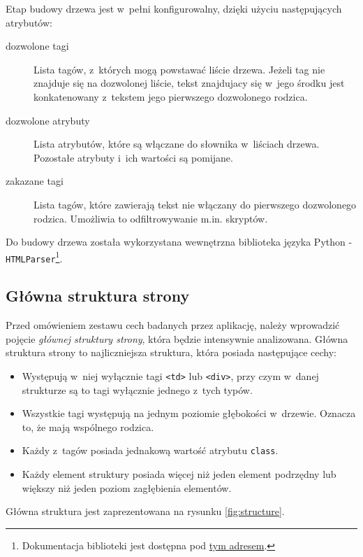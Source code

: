 \documentclass[a4paper,11pt]{article}
\begin{document}
Etap budowy drzewa jest w~pełni konfigurowalny, dzięki użyciu następujących atrybutów:

\begin{description}
    \item[dozwolone tagi] Lista tagów, z~których mogą powstawać liście drzewa. Jeżeli tag nie znajduje się na dozwolonej liście, tekst znajdujacy się w~jego środku jest konkatenowany z~tekstem jego pierwszego dozwolonego rodzica.
    \item[dozwolone atrybuty] Lista atrybutów, które są włączane do słownika w~liściach drzewa. Pozostałe atrybuty i~ich wartości są pomijane.
    \item[zakazane tagi] Lista tagów, które zawierają tekst nie włączany do pierwszego dozwolonego rodzica. Umożliwia to odfiltrowywanie m.in. skryptów.
\end{description}

Do budowy drzewa została wykorzystana wewnętrzna biblioteka języka Python - \verb+HTMLParser+\footnote{Dokumentacja biblioteki jest dostępna pod \href{http://docs.python.org/2/library/htmlparser.html}{tym adresem}.}.

\subsection{Główna struktura strony}
\label{sec:main_structure}

Przed omówieniem zestawu cech badanych przez aplikację, należy wprowadzić pojęcie \emph{głównej struktury strony}, która będzie intensywnie analizowana. Główna struktura strony to najliczniejsza struktura, która posiada następujące cechy:

\begin{itemize}
    \item Występują w~niej wyłącznie tagi \verb+<td>+ lub \verb+<div>+, przy czym w~danej strukturze są to tagi wyłącznie jednego z~tych typów.
    \item Wszystkie tagi występują na jednym poziomie głębokości w~drzewie. Oznacza to, że mają wspólnego rodzica.
    \item Każdy z~tagów posiada jednakową wartość atrybutu \verb+class+.
    \item Każdy element struktury posiada więcej niż jeden element podrzędny lub większy niż jeden poziom zagłębienia elementów.
\end{itemize}

Główna struktura jest zaprezentowana na rysunku \ref{fig:structure}.
\end{document}
